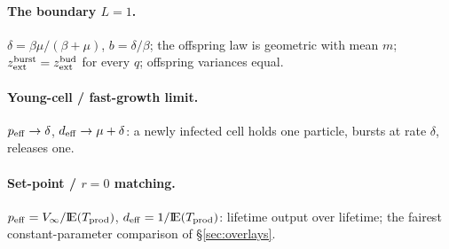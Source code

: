 \paragraph{The boundary $L=1$.} $\delta=\beta\mu/(\beta+\mu)$,
$b=\delta/\beta$; the offspring law is geometric with mean $m$;
$z_{\rm ext}^{\rm burst}=z_{\rm ext}^{\rm bud}$ for every $q$; offspring
variances equal.

\paragraph{Young-cell / fast-growth limit.} $p_{\rm eff}\to\delta$,
$d_{\rm eff}\to\mu+\delta$: a newly infected cell holds one particle,
bursts at rate $\delta$, releases one.

\paragraph{Set-point / $r=0$ matching.}
$p_{\rm eff}=V_\infty/{\rm I}\!{\rm E}(T_{\rm prod})$,
$d_{\rm eff}=1/{\rm I}\!{\rm E}(T_{\rm prod})$: lifetime output over lifetime; the
fairest constant-parameter comparison of \S\ref{sec:overlays}.
